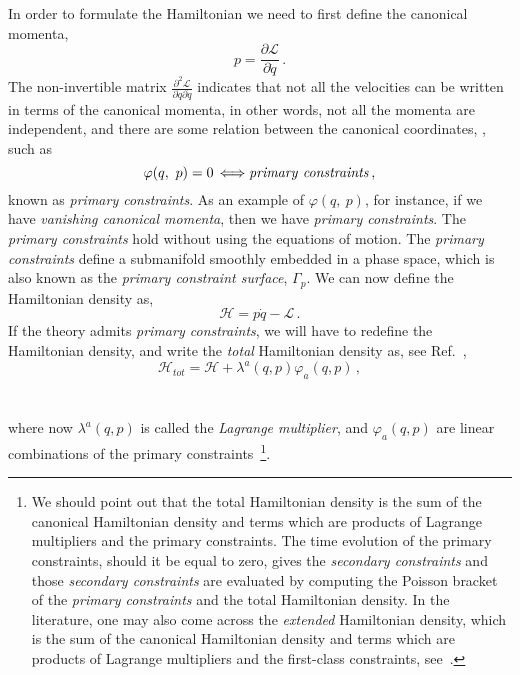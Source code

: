 \documentclass[a4paper,12pt]{article}
\newcommand{\Ga}{\Gamma}
\newcommand{\+}{^{\dagger}}
\newcommand{\2}{\frac{1}{2}}
\newcommand{\3}{\frac{1}{3}}
\newcommand{\4}{\frac{1}{4}}
\newcommand{\6}{\frac{1}{6}}
\newcommand{\8}{\frac{1}{8}}
\begin{document}
In order to formulate the Hamiltonian we need to first define the canonical momenta, 
\begin{equation}
p=\frac{\partial\mathcal{L}}{\partial\dot{q}}\,.
\end{equation}
The non-invertible matrix $\frac{\partial^{2}\mathcal{L}}{\partial
\dot{q}\partial \dot{q}}$ indicates that not all the velocities can be written in terms of the canonical momenta, in other words, not all the momenta are independent, and there are some relation between the canonical coordinates, \cite{Anderson:1951ta,Dirac:1958sq,Dirac:1958sc,Dirac1,Wipf:1993xg}, such as
\begin{equation}
\varphi(q,~p)=0\, \Longleftrightarrow {\it primary~constraints}\,,
\end{equation}
known as \textit{primary constraints}. As an example of $\varphi(q,~p)$, for instance, if we have {\it vanishing canonical momenta}, then we have {\it primary constraints}. The \textit{primary constraints} hold without using the equations of motion. The {\it primary constraints} define a submanifold smoothly embedded in a phase space, which is also known as the \textit{primary constraint surface}, 
$\Ga_p$. We can now define the Hamiltonian density as, 
\begin{equation}
\mathcal{H}=p\dot{q}-\mathcal{L}\,.
\end{equation}
If the theory admits {\it primary constraints}, we will have to redefine the Hamiltonian density,  and write the \textit{total} Hamiltonian density as, see Ref.~\cite{Dirac1}, 
\begin{equation}\label{totalH}
\mathcal{H}_{tot}=\mathcal{H}+\lambda^{a}(q,p)\varphi_{a} (q,p)\,,
\end{equation}
\\\\
where now $\lambda^{a}(q,p)$ is called the {\it Lagrange multiplier}, and $\varphi_{a} (q,p)$ are linear combinations of the primary constraints~\footnote{We should point out that the total Hamiltonian density is the sum of the canonical Hamiltonian density and terms which are products of Lagrange multipliers and the primary constraints. The time evolution of the primary constraints, should it be equal to zero, gives  the {\it secondary constraints} and those {\it secondary constraints} are evaluated by computing the Poisson bracket of the {\it primary constraints} and the total Hamiltonian density. In the literature, one may also come across the \textit{extended} Hamiltonian density, which is the sum of the canonical Hamiltonian density and terms which are products of Lagrange multipliers and the first-class constraints, see~\cite{Henneaux}.}.
\end{document}
